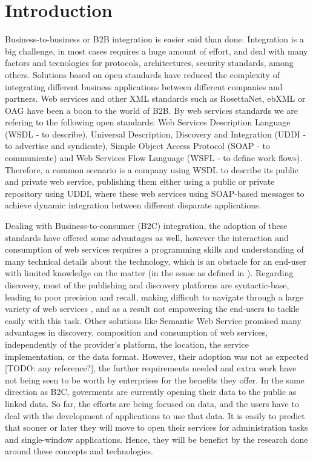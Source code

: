 
\section{Introduction}

Business-to-business or B2B integration is easier said than done. Integration is a big challenge, in most cases requires a huge amount of effort, and deal with many factors and tecnologies for protocols, architectures, security standards, among others. Solutions based on open standards have reduced the complexity of integrating different business applications between different companies and partners. Web services and other XML standards such as RosettaNet, ebXML or OAG have been a boon to the world of B2B. By web services standards we are refering to the following open standards: Web Services Description Language (WSDL - to describe), Universal Description, Discovery and Integration (UDDI - to advertise and syndicate), Simple Object Access Protocol (SOAP - to communicate) and Web Services Flow Language (WSFL - to define work flows). Therefore, a common scenario is a company using WSDL to describe its public and private web service, publishing them either using a public or private repository using UDDI, where these web services using SOAP-based messages to achieve dynamic integration between different disparate applications.

Dealing with Business-to-consumer (B2C) integration, the adoption of these standards have offered some advantages as well, however the interaction and consumption of web services requires a programming skills and understanding of many technical details about the technology, which is an obstacle for an end-user with limited knowledge on the matter (in the sense as defined in \cite{fuchsloch2010}). Regarding discovery, most of the publishing and discovery platforms are syntactic-base, leading to poor precision and recall, making difficult to navigate through a large variety of web services \cite{pilioura_acm2009}, and as a result not empowering the end-users to tackle easily with this task. Other solutions like Semantic Web Service promised many advantages in discovery, composition and consumption of web services, independently of the provider's platform, the location, the service implementation, or the data format. However, their adoption was not as expected [TODO: any reference?], the further requirements needed and extra work have not being seen to be worth by enterprises for the benefits they offer. In the same direction as B2C, goverments are currently opening their data to the public as linked data. So far, the efforts are being focused on data, and the users have to deal with the development of applications to use that data. It is easily to predict that sooner or later they will move to open their services for administration tasks and single-window applications. Hence, they will be benefict by the research done around these concepts and technologies.

